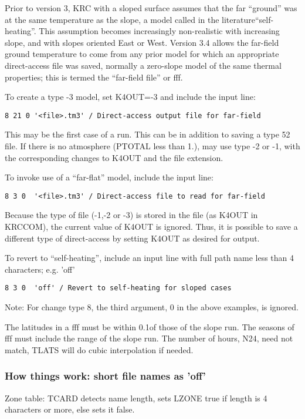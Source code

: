 

Prior to version 3, KRC with a sloped surface assumes that the far ``ground''
was at the same temperature as the slope, a model called in the
literature``self-heating''. This assumption becomes increasingly non-realistic
with increasing slope, and with slopes oriented East or West. Version 3.4 allows
the far-field ground temperature to come from any prior model for which an
appropriate direct-access file was saved, normally a zero-slope model of the
same thermal properties; this is termed the ``far-field file'' or fff.

To create a type -3 model, set K4OUT=-3 and include the input line:
\vspace{-3.mm}
\begin{verbatim}
8 21 0 '<file>.tm3' / Direct-access output file for far-field
\end{verbatim}
This may be the first case of a run. This can be in addition to saving a type 52
file. If there is no atmosphere (PTOTAL less than 1.), may use type -2 or -1,
with the corresponding changes to K4OUT and the file extension.

To invoke use of a ``far-flat'' model, include the input line:
\vspace{-3.mm}
\begin{verbatim}
8 3 0  '<file>.tm3' / Direct-access file to read for far-field
\end{verbatim}
Because the type of file (-1,-2 or -3) is stored in the file (as K4OUT in
KRCCOM), the current value of K4OUT is ignored. Thus, it is possible to save a
different type of direct-access by setting K4OUT as desired for output.


To revert to ``self-heating'', include an input line with full path name less than 4 characters; e.g. 'off'
\vspace{-3.mm}
\begin{verbatim}
8 3 0  'off' / Revert to self-heating for sloped cases
\end{verbatim}

Note: For change type 8, the third argument, 0 in the above examples, is ignored.

The latitudes in a fff must be within 0.1\qd of those of the slope run. The
seasons of fff must include the range of the slope run. The number of hours,
N24, need not match, TLATS will do cubic interpolation if needed.


\subsubsection{How things work:  short file names as 'off'}
Zone table: TCARD detects name length, sets LZONE true if length is 4 characters or more, else sets it false.

